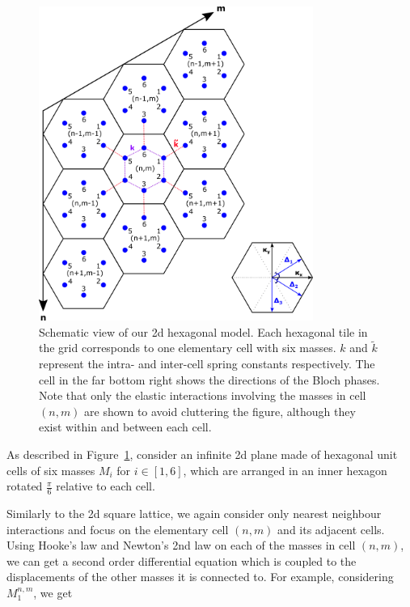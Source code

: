 \begin{figure}[!h]
\centering
\includegraphics[width=0.8\textwidth]{imgs/hexmodel.png}
\caption{\label{fig:hexscheme} Schematic view of our 2d hexagonal model. Each
  hexagonal tile in the grid corresponds to one elementary cell with six
  masses. $k$ and $\tilde{k}$ represent the intra- and inter-cell spring
  constants respectively. The cell in the far bottom right shows the directions
  of the Bloch phases. Note that only the elastic interactions involving the
  masses in cell $(n,m)$ are shown to avoid cluttering the figure, although
  they exist within and between each cell.}
\end{figure}

As described in Figure~\ref{fig:hexscheme}, consider an infinite 2d plane made
of hexagonal unit cells of six masses $M_i$ for $i\in\left[1,6\right]$, which
are arranged in an inner hexagon rotated $\frac{\pi}{6}$ relative to each cell.

Similarly to the 2d square lattice, we again consider only nearest neighbour
interactions and focus on the elementary cell $(n,m)$ and its adjacent cells.
Using Hooke's law and Newton's 2nd law on each of the masses in cell $(n,m)$,
we can get a second order differential equation which is coupled to the
displacements of the other masses it is connected to. For example, considering
$M_1^{n,m}$, we get


